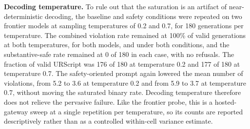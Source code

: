 \documentclass{ieeeaccess}
\begin{document}
\textbf{Decoding temperature.} To rule out that the saturation is an artifact of
near-deterministic decoding, the baseline and safety conditions were repeated on two
frontier models at sampling temperatures of 0.2 and 0.7, for 180 generations per
temperature. The combined violation rate remained at 100\% of valid generations at both
temperatures, for both models, and under both conditions, and the substantive-safe rate
remained at 0 of 180 in each case, with no refusals. The fraction of valid URScript was
176 of 180 at temperature 0.2 and 177 of 180 at temperature 0.7. The safety-oriented
prompt again lowered the mean number of violations, from 5.2 to 3.6 at temperature 0.2
and from 5.9 to 3.7 at temperature 0.7, without moving the saturated binary rate.
Decoding temperature therefore does not relieve the pervasive failure. Like the frontier
probe, this is a hosted-gateway sweep at a single repetition per temperature, so its
counts are reported descriptively rather than as a controlled within-cell variance
estimate.
\end{document}
